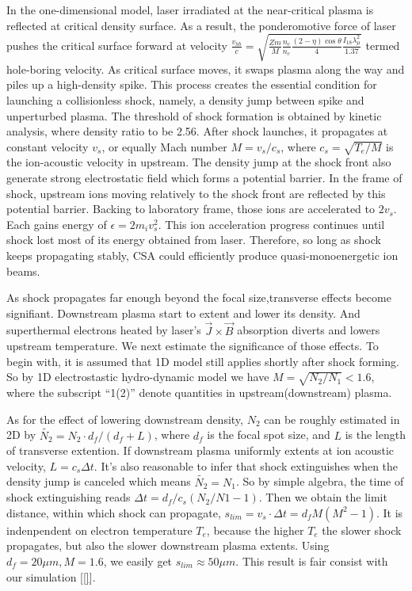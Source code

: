 \documentclass[12pt]{iopart}
\begin{document}
In the one-dimensional model, laser irradiated at the near-critical plasma is reflected at critical density surface. As a result, the ponderomotive force of laser pushes the critical surface forward at velocity $\frac{v_{hb}}{c}=\sqrt{\frac{Z m}{M}\frac{n_c}{n_e}\frac{(2-\eta)\cos\theta}{4}\frac{I_{18} \lambda_{\mu}^2}{1.37}}$ termed hole-boring velocity\cite{gibbon_short_2005}. As critical surface moves, it swaps plasma along the way and piles up a high-density spike. This process creates the essential condition for launching a collisionless shock, namely, a density jump between spike and unperturbed plasma. The threshold of shock formation is obtained by kinetic analysis, where density ratio to be 2.56. After shock launches, it propagates at constant velocity $v_{s}$, or equally Mach number $M=v_s/c_s$, where $c_s=\sqrt{T_e/M}$ is the ion-acoustic velocity in upstream. The density jump at the shock front also generate strong electrostatic field which forms a potential barrier. In the frame of shock, upstream ions moving relatively to the shock front are reflected by this potential barrier. Backing to laboratory frame, those ions are accelerated to $2v_s$. Each gains energy of $\epsilon=2m_i v_s^2$.  This ion acceleration progress continues until shock lost most of its energy obtained from laser. Therefore, so long as shock keeps propagating stably, CSA could efficiently produce quasi-monoenergetic ion beams.

As shock propagates far enough beyond the focal size,transverse effects become signifiant. Downstream plasma start to extent and lower its density. And superthermal electrons heated by laser's $\vec{J}\times \vec{B} $ absorption\cite{gibbon_short_2005} diverts and lowers upstream temperature. We next estimate the significance of those effects. To begin with, it is assumed that 1D model still applies shortly after shock forming. So by 1D electrostastic hydro-dynamic model\cite{zhang_quasi-monoenergetic_2016,tidman_shock_1971} we have $M=\sqrt{N_2 / N_1}<1.6$, where the subscript ``1(2)'' denote quantities in upstream(downstream) plasma. 

As for the effect of lowering downstream density, $N_2$ can be roughly estimated in 2D by $\tilde{N_2}=N_2 \cdot d_f\big/(d_f+L)$, where $d_f$ is the focal spot size, and $L$ is the length of transverse extention. If downstream plasma uniformly extents at ion acoustic velocity, $L=c_s\Delta t$. It's also reasonable to infer that shock extinguishes when the density jump is canceled which means $\tilde{N_2}=N_1$. So by simple algebra, the time of shock extinguishing reads $\Delta t=d_f/c_s(N_2/N1-1)$. Then we obtain the limit distance, within which shock can propagate, $s_{lim}=v_s \cdot \Delta t=d_fM(M^2-1)$. It is indenpendent on electron temperature $T_e$, because the higher $T_e$ the slower shock propagates, but also the slower downstream plasma extents. Using $d_f=20\mu m,M=1.6$, we easily get $s_{lim}\approx 50\mu m$. This result is fair consist with our simulation [\ref{}].
\end{document}
